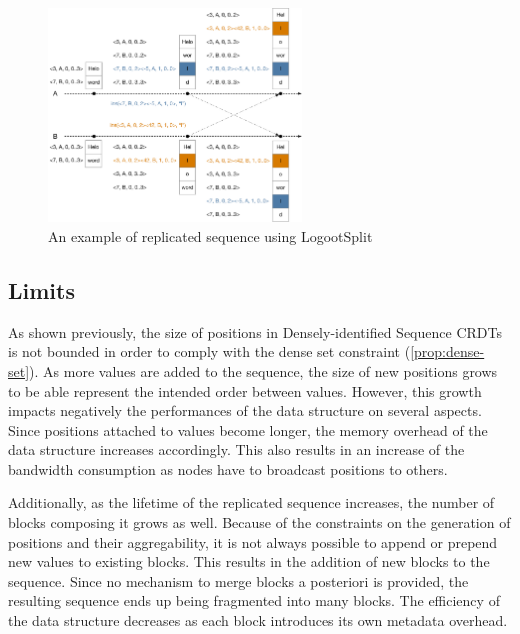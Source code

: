 \documentclass{article}
\theoremstyle{definition}
\begin{document}
\begin{figure}
    \centering
        \includegraphics[width=0.6\textwidth]{img/logootsplit-seq.pdf}
    \caption{An example of replicated sequence using LogootSplit}
    \label{fig:logootsplit-example}
\end{figure}


\subsection{Limits}

As shown previously, the size of positions in Densely-identified Sequence \acp{CRDT} is not bounded in order to comply with the dense set constraint (\autoref{prop:dense-set}).
As more values are added to the sequence, the size of new positions grows to be able represent the intended order between values.
However, this growth impacts negatively the performances of the data structure on several aspects.
Since positions attached to values become longer, the memory overhead of the data structure increases accordingly.
This also results in an increase of the bandwidth consumption as nodes have to broadcast positions to others.

Additionally, as the lifetime of the replicated sequence increases, the number of blocks composing it grows as well.
Because of the constraints on the generation of positions and their aggregability, it is not always possible to append or prepend new values to existing blocks.
This results in the addition of new blocks to the sequence.
Since no mechanism to merge blocks a posteriori is provided, the resulting sequence ends up being fragmented into many blocks.
The efficiency of the data structure decreases as each block introduces its own metadata overhead.
\end{document}
